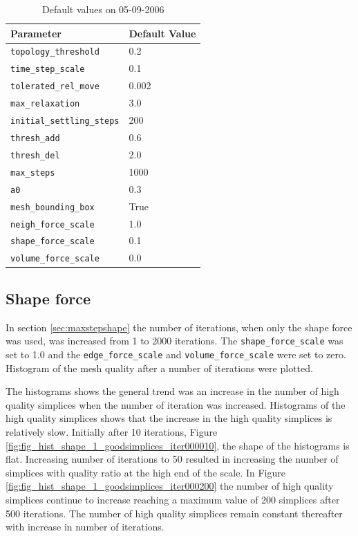 \documentclass[10pt,a4paper]{book}
\begin{document}
\begin{table}[tbhp]
\caption{Default values on 05-09-2006}
\centering
\begin{tabular}{ll}
\hline
\hline
Parameter & Default Value \\
\hline
\texttt{topology\_threshold} & 0.2\\
\texttt{time\_step\_scale} & 0.1\\
\texttt{tolerated\_rel\_move} & 0.002\\
\texttt{max\_relaxation} & 3.0\\
\texttt{initial\_settling\_steps} & 200\\
\texttt{thresh\_add} & 0.6\\
\texttt{thresh\_del} & 2.0\\
\texttt{max\_steps} & 1000\\
\texttt{a0} & 0.3\\
\texttt{mesh\_bounding\_box} & True\\
\texttt{neigh\_force\_scale} & 1.0\\
\texttt{shape\_force\_scale} & 0.1\\
\texttt{volume\_force\_scale} & 0.0\\
\hline
\end{tabular}
\label{table:defaultvalues05092006}
\end{table}

\subsection{Shape force}
In section \ref{sec:maxstepshape} the number of iterations, when only the shape force was used, was increased from 1 to 2000 iterations. The \texttt{shape\_force\_scale} was set to 1.0 and the \texttt{edge\_force\_scale} and \texttt{volume\_force\_scale} were set to zero. Histogram of the mesh quality after a number of iterations were plotted.
 
The histograms shows the general trend was an increase in the number of high quality simplices  when the number of iteration was increased. Histograms of the high quality simplices shows that the increase in the high quality simplices is relatively slow. Initially after 10 iterations, Figure \ref{fig:fig_hist_shape_1_goodsimplices_iter000010}, the shape of the histograms is flat. Increasing number of iterations to 50 resulted in increasing the number of simplices with quality ratio at the high end of the scale. In Figure \ref{fig:fig_hist_shape_1_goodsimplices_iter000200} the number of high quality simplices continue to increase reaching a maximum value of 200 simplices after 500 iterations. The number of high quality simplices remain constant thereafter with increase in number of iterations.
\end{document}

